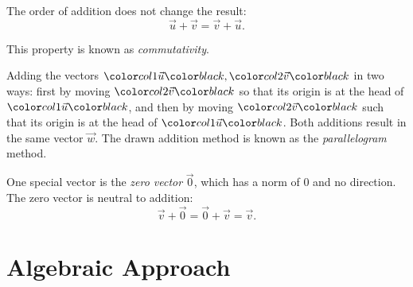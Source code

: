 The order of addition does not change the result:
\begin{equation*}
  \vec{u} + \vec{v} = \vec{v} + \vec{u}.
\end{equation*}

This property is known as \emph{commutativity}.

\begin{example}
  Adding the vectors $\vecu,\vecv$ in two ways: first by moving $\vecv$ so that its origin is at the head of $\vecu$, and then by moving $\vecv$ such that its origin is at the head of $\vecu$. Both additions result in the same vector $\vec{w}$. The drawn addition method is known as the \emph{parallelogram} method.
  \begin{figure}[H]
  \renewcommand*\thesubfigure{\arabic{subfigure}}
  \begin{subfigure}[b]{0.5\textwidth}
  \centering
  \caption{}
  \end{subfigure}
  \begin{subfigure}[b]{0.5\textwidth}
  \centering
  \caption{}
  \end{subfigure}
  \end{figure}
\end{example}

One special vector is the \emph{zero vector} $\vec{0}$, which has a norm of $0$ and no direction. The zero vector is neutral to addition:
\begin{equation*}
  \vec{v} + \vec{0} = \vec{0} + \vec{v} = \vec{v}.
\end{equation*}

\newpage
\section{Algebraic Approach}

